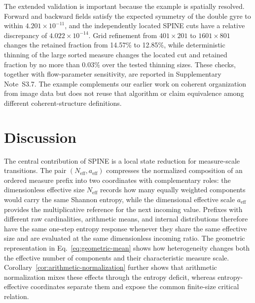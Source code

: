 \documentclass[aip,cha,reprint,superscriptaddress,floatfix]{revtex4-2}
\theoremstyle{definition}
\theoremstyle{remark}
\newcommand{\Neff}{N_{\mathrm{eff}}}
\newcommand{\aeff}{a_{\mathrm{eff}}}
\begin{document}
The extended validation is important because the example is spatially resolved. Forward and backward fields satisfy the expected symmetry of the double gyre to within \(4.201\times10^{-11}\), and the independently located SPINE cuts have a relative discrepancy of \(4.022\times10^{-14}\). Grid refinement from \(401\times201\) to \(1601\times801\) changes the retained fraction from 14.57\% to 12.85\%, while deterministic thinning of the large sorted measure changes the located cut and retained fraction by no more than 0.03\% over the tested thinning sizes. These checks, together with flow-parameter sensitivity, are reported in Supplementary Note~S3.7. The example complements our earlier work on coherent organization from image data \cite{almomani2020coherence} but does not reuse that algorithm or claim equivalence among different coherent-structure definitions.

\section{Discussion}
\label{sec:discussion}

The central contribution of SPINE is a local state reduction for measure-scale transitions. The pair \((\Neff,\aeff)\) compresses the normalized composition of an ordered measure prefix into two coordinates with complementary roles: the dimensionless effective size \(\Neff\) records how many equally weighted components would carry the same Shannon entropy, while the dimensional effective scale \(\aeff\) provides the multiplicative reference for the next incoming value. Prefixes with different raw cardinalities, arithmetic means, and internal distributions therefore have the same one-step entropy response whenever they share the same effective size and are evaluated at the same dimensionless incoming ratio. The geometric representation in Eq.~\eqref{eq:geometric-mean} shows how heterogeneity changes both the effective number of components and their characteristic measure scale. Corollary~\ref{cor:arithmetic-normalization} further shows that arithmetic normalization mixes these effects through the entropy deficit, whereas entropy-effective coordinates separate them and expose the common finite-size critical relation.
\end{document}
